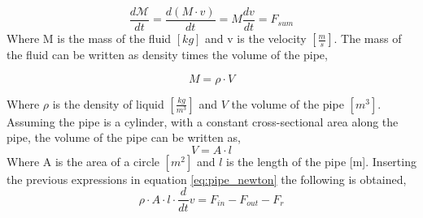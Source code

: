 \begin{equation}\label{eq:pipe_newton}
	\frac{d\mathcal{M}}{dt}=\frac{d(M\cdot v)}{dt}=M\frac{dv}{dt}=F_{sum}
\end{equation}
Where M is the mass of the fluid $[kg]$ and v is the velocity $\left[\frac{m}{s}\right]$.  
The mass of the fluid can be written as density times the volume of the pipe,

\begin{equation}
M = \rho \cdot V 
\end{equation}

Where $\rho$ is the density of liquid $\left[\frac{kg}{m^3}\right]$ and $V$ the volume of the pipe $\left[m^3\right]$.
Assuming the pipe is a cylinder, with a constant cross-sectional area along the pipe, the volume of the pipe can be written as, 
\begin{equation}
 V=A \cdot l
\end{equation}
Where A is the area of a circle $[m^2]$ and $l$ is the length of the pipe [m].
Inserting the previous expressions in equation \ref{eq:pipe_newton} the following is obtained,
\begin{equation} \label{eq:pipe_newton_2}
\rho \cdot A \cdot l \cdot \frac{d}{dt}v = F_{in}-F_{out}-F_r 
\end{equation}

